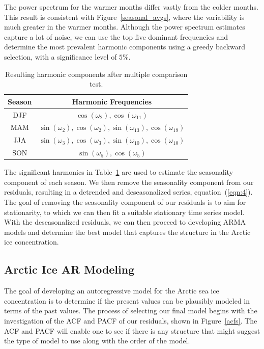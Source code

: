 \documentclass[12pt]{article}
\begin{document}
The power spectrum for the warmer months differ vastly from the colder months. This result is consistent with Figure~\ref{seasonal_avgs}, where the variability is much greater in the warmer months. Although the power spectrum estimates capture a lot of noise, we can use the top five dominant frequencies and determine the most prevalent harmonic components using a greedy backward selection, with a significance level of $5\%$.

\begin{table}[!htb]
\centering
\begin{tabular}{|c|c|}
\hline
\textbf{Season}       & \textbf{Harmonic Frequencies} \\ \hline\hline
DJF & $\cos(\omega_2), \cos(\omega_{11})$ \\ \hline
MAM & $\sin(\omega_2), \cos(\omega_2), \sin(\omega_{13}), \cos(\omega_{19})$ \\ \hline
JJA & $\sin(\omega_3), \cos(\omega_3), \sin(\omega_{10}), \cos(\omega_{10})$ \\ \hline
SON & $\sin(\omega_5), \cos(\omega_5)$ \\ \hline
\end{tabular}
\caption{Resulting harmonic components after multiple comparison test.}\label{my_harmonics}
\end{table}

The significant harmonics in Table~\ref{my_harmonics} are used to estimate the seasonality component of each season. We then remove the seasonality component from our residuals, resulting in a detrended and deseasonalized series, equation~(\ref{eqn:4}). The goal of removing the seasonality component of our residuals is to aim for stationarity, to which we can then fit a suitable stationary time series model. With the deseasonalized residuals, we can then proceed to developing ARMA models and determine the best model that captures the structure in the Arctic ice concentration.

\subsection{Arctic Ice AR Modeling}
The goal of developing an autoregressive model for the Arctic sea ice concentration is to determine if the present values can be plausibly modeled in terms of the past values. The process of selecting our final model begins with the investigation of the ACF and PACF of our residuals, shown in Figure~\ref{acfs}. The ACF and PACF will enable one to see if there is any structure that might suggest the type of model to use along with the order of the model.
 
\end{document}
